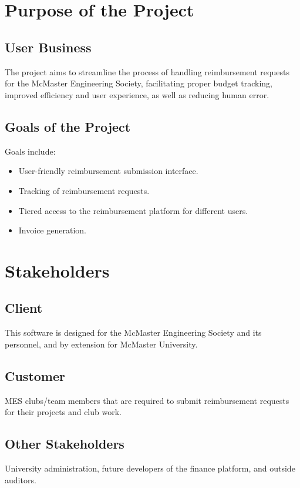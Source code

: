 \documentclass[12pt]{article}
\begin{document}
~\\

~\newpage
\section{Purpose of the Project}
\subsection{User Business}
The project aims to streamline the process of handling reimbursement requests for the McMaster Engineering Society, facilitating proper budget tracking, improved efficiency and user experience, as well as reducing human error.

\subsection{Goals of the Project}
Goals include:
\begin{itemize}
    \item User-friendly reimbursement submission interface.
    \item Tracking of reimbursement requests.
    \item Tiered access to the reimbursement platform for different users.
    \item Invoice generation.
\end{itemize}

\section{Stakeholders}
\subsection{Client}
This software is designed for the McMaster Engineering Society and its personnel, and by extension for McMaster University.

\subsection{Customer}
MES clubs/team members that are required to submit reimbursement requests for their projects and club work.

\subsection{Other Stakeholders}
University administration, future developers of the finance platform, and outside auditors.
\end{document}
